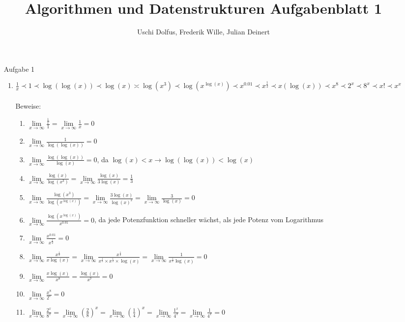\documentclass[12pt,a4paper]{article}
\author{Uschi Dolfus, Frederik Wille, Julian Deinert}
\title{Algorithmen und Datenstrukturen Aufgabenblatt 1}
\begin{document}
\maketitle

\begin{enumerate}
  \item[Aufgabe] 1
  \begin{enumerate}
    \item $\frac{1}{x} \prec 1 \prec \log(\log(x)) \prec \log(x) \asymp \log(x^{3}) \prec \log(x^{\log(x)}) \prec x^{0.01} \prec x^{\frac{1}{2}} \prec x(\log(x)) \prec x^{8} \prec 2^{x} \prec 8^{x} \prec x! \prec x^{x}  $ \\\\
	Beweise: \\
	\begin{enumerate}	    
    \item $\lim\limits_{x \to \infty}{\frac{\frac{1}{x}}{1}} = \lim\limits_{x \to \infty}{\frac{1}{x}} = 0$
	\item $\lim\limits_{x \to \infty}{\frac{1}{\log(\log(x))}} = 0$ 
	\item $\lim\limits_{x \to \infty}{\frac{\log(\log(x))}{\log(x)}} = 0 $, da $\log(x) < x \to \log(\log(x)) < \log(x)$
	\item $\lim\limits_{x \to \infty}{\frac{\log(x)}{\log(x^{3})}} = \lim\limits_{x \to \infty}{\frac{\log(x)}{3\log(x)}} = \frac{1}{3}$
	\item $\lim\limits_{x \to \infty}{\frac{\log(x^{3})}{\log(x^{\log(x)})}} = \lim\limits_{x \to \infty}{\frac{3\log(x)}{\log(x)^{2}}} = \lim\limits_{x \to \infty}{\frac{3}{\log(x)}} = 0 $
	\item $\lim\limits_{x \to \infty}{\frac{\log(x^{\log(x)})}{x^{0.01}}} = 0$, da jede Potenzfunktion schneller wächst, als jede Potenz vom Logarithmus
	\item $\lim\limits_{x \to \infty}{\frac{x^{0.01}}{x^{\frac{1}{2}}}} = 0$
	\item $\lim\limits_{x \to \infty}{\frac{x^{\frac{1}{2}}}{x\log(x)}} = \lim\limits_{x \to \infty}{\frac{x^{\frac{1}{2}}}{x^{\frac{1}{2}}\times x^{\frac{1}{2}}\times \log(x)}} = \lim\limits_{x \to \infty}{\frac{1}{x^{\frac{1}{2}}\log(x)}} = 0$
	\item $\lim\limits_{x \to \infty}{\frac{x\log(x)}{x^{8}}} = \frac{\log(x)}{x^{7}} = 0 $
	\item $\lim\limits_{x \to \infty}{\frac{x^{8}}{2^{x}}} = 0$
	\item $\lim\limits_{x \to \infty}{\frac{2^{x}}{8^{x}}} = \lim\limits_{x \to \infty}{(\frac{2}{8})^{x}} = \lim\limits_{x \to \infty}{(\frac{1}{4})^{x}} = \lim\limits_{x \to \infty}{\frac{1^{x}}{4^{x}}} = \lim\limits_{x \to \infty}{\frac{1}{4^{x}}} = 0$

\end{enumerate}
\end{enumerate}
\end{enumerate}
\end{document}
